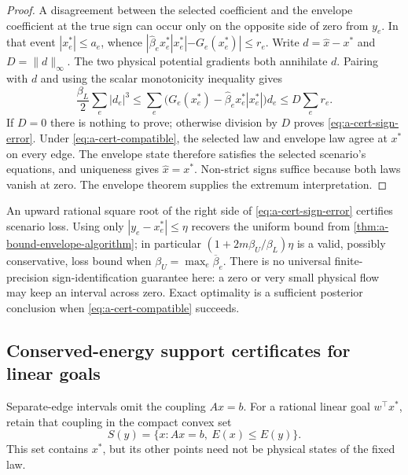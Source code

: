 \begin{proof}
A disagreement between the selected coefficient and the envelope
coefficient at the true sign can occur only on the opposite side of
zero from $y_e$. In that event $|x_e^*|\le a_e$, whence
$|\widehat\beta_e x_e^*|x_e^*|-G_e(x_e^*)|\le r_e$.
Write $d=\widehat x-x^*$ and $D=\|d\|_\infty$.
The two physical potential gradients both annihilate $d$. Pairing
with $d$ and using the scalar monotonicity inequality gives
\[
 \frac{\beta_L}{2}\sum_e|d_e|^3
 \le\sum_e\bigl(G_e(x_e^*)-
              \widehat\beta_e x_e^*|x_e^*|\bigr)d_e
 \le D\sum_e r_e.
\]
If $D=0$ there is nothing to prove; otherwise division by $D$
proves \eqref{eq:a-cert-sign-error}. Under
\eqref{eq:a-cert-compatible}, the selected law and envelope law
agree at $x^*$ on every edge. The envelope state therefore satisfies
the selected scenario's equations, and uniqueness gives
$\widehat x=x^*$. Non-strict signs suffice because both laws vanish
at zero. The envelope theorem supplies the extremum interpretation.
\end{proof}

An upward rational square root of the right side of
\eqref{eq:a-cert-sign-error} certifies scenario loss. Using only
$|y_e-x_e^*|\le\eta$ recovers the uniform bound from
\cref{thm:a-bound-envelope-algorithm}; in particular
$(1+2m\beta_U/\beta_L)\eta$ is a valid, possibly conservative,
loss bound when $\beta_U=\max_e\overline\beta_e$.
There is no universal finite-precision sign-identification guarantee
here: a zero or very small physical flow may keep an interval across
zero. Exact optimality is a sufficient posterior conclusion when
\eqref{eq:a-cert-compatible} succeeds.

\subsection{Conserved-energy support certificates for linear goals}

Separate-edge intervals omit the coupling $Ax=b$. For a rational
linear goal $w^\top x^*$, retain that coupling in the compact convex set
\[
 S(y)=\{x:Ax=b,\ E(x)\le E(y)\}.
\]
This set contains $x^*$, but its other points need not be physical
states of the fixed law.

